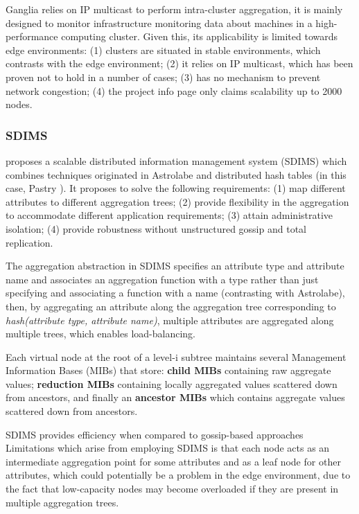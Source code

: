 Ganglia relies on IP multicast to perform intra-cluster aggregation, it is mainly designed to monitor infrastructure monitoring data about machines in a high-performance computing cluster. Given this, its applicability is limited towards edge environments: (1) clusters are situated in stable environments, which contrasts with the edge environment; (2) it relies on IP multicast, which has been proven not to hold in a number of cases; (3) has no mechanism to prevent network congestion; (4) the project info page only claims scalability up to 2000 nodes.

\subsubsection{SDIMS}

\cite{SDIMS} proposes a scalable distributed information management system (SDIMS) which combines techniques originated in Astrolabe \cite{Renesse2003} and distributed hash tables (in this case, Pastry \cite{rowstron2001pastry}). It proposes to solve the following requirements: (1) map different attributes to different aggregation trees; (2) provide flexibility in the aggregation to accommodate different application requirements; (3) attain administrative isolation; (4) provide robustness without unstructured gossip and total replication.

The aggregation abstraction in SDIMS specifies an attribute type and attribute name and associates an aggregation function with a type rather than just specifying and associating a function with a name (contrasting with Astrolabe), then, by aggregating an attribute along the aggregation tree corresponding to \textit{hash(attribute type, attribute name)}, multiple attributes are aggregated along multiple trees, which enables load-balancing.

Each virtual node at the root of a level-i subtree maintains several Management Information Bases (MIBs) that store: \textbf{child MIBs} containing raw aggregate values; \textbf{reduction MIBs} containing locally aggregated values scattered down from ancestors, and finally an \textbf{ancestor MIBs} which contains aggregate values scattered down from ancestors.

SDIMS provides efficiency when compared to gossip-based approaches
Limitations which arise from employing SDIMS is that each node acts as an intermediate aggregation point for some attributes and as a leaf node for other attributes, which could potentially be a problem in the edge environment, due to the fact that low-capacity nodes may become overloaded if they are present in multiple aggregation trees. 

